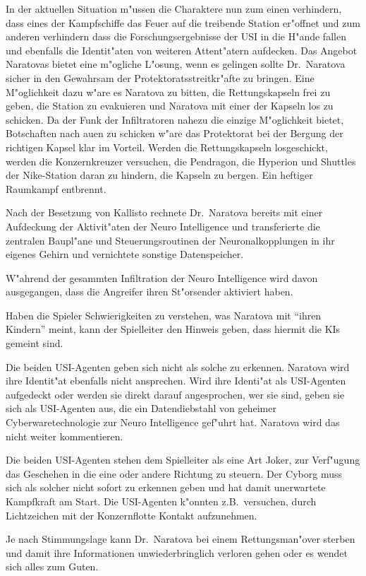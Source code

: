 In der aktuellen Situation m"ussen die Charaktere nun zum einen verhindern, dass eines der Kampfschiffe das Feuer auf die treibende Station er"offnet und zum anderen verhindern dass die Forschungsergebnisse der USI in die H"ande fallen und ebenfalls die Identit"aten von weiteren Attent"atern aufdecken. Das Angebot Naratovas bietet eine m"ogliche L"osung, wenn es gelingen sollte Dr.~Naratova sicher in den Gewahrsam der Protektoratsstreitkr"afte zu bringen. Eine M"oglichkeit dazu w"are es Naratova zu bitten, die Rettungskapseln frei zu geben, die Station zu evakuieren und Naratova mit einer der Kapseln los zu schicken. Da der Funk der Infiltratoren nahezu die einzige M"oglichkeit bietet, Botschaften nach au\3en zu schicken w"are das Protektorat bei der Bergung der richtigen Kapsel klar im Vorteil. Werden die Rettungskapseln losgeschickt, werden die Konzernkreuzer versuchen, die Pendragon, die Hyperion und Shuttles der Nike-Station daran zu hindern, die Kapseln zu bergen. Ein heftiger Raumkampf entbrennt.

\begin{remarks}
	Nach der Besetzung von Kallisto rechnete Dr.~Naratova bereits mit einer Aufdeckung der Aktivit"aten der Neuro Intelligence und transferierte die zentralen Baupl"ane und Steuerungsroutinen der Neuronalkopplungen in ihr eigenes Gehirn und vernichtete sonstige Datenspeicher.
	
	W"ahrend der gesammten Infiltration der Neuro Intelligence wird davon ausgegangen, dass die Angreifer ihren St"orsender aktiviert haben.
	
	Haben die Spieler Schwierigkeiten zu verstehen, was Naratova mit "`ihren Kindern"' meint, kann der Spielleiter den Hinweis geben, dass hiermit die KIs gemeint sind.
	
	Die beiden USI-Agenten geben sich nicht als solche zu erkennen. Naratova wird ihre Identit"at ebenfalls nicht ansprechen. Wird ihre Identi"at als USI-Agenten aufgedeckt oder werden sie direkt darauf angesprochen, wer sie sind, geben sie sich als USI-Agenten aus, die ein Datendiebstahl von geheimer Cyberwaretechnologie zur Neuro Intelligence gef"uhrt hat. Naratova wird das nicht weiter kommentieren.
	
	Die beiden USI-Agenten stehen dem Spielleiter als eine Art Joker, zur Verf"ugung das Geschehen in die eine oder andere Richtung zu steuern. Der Cyborg muss sich als solcher nicht sofort zu erkennen geben und hat damit unerwartete Kampfkraft am Start. Die USI-Agenten k"onnten z.B.~versuchen, durch Lichtzeichen mit der Konzernflotte Kontakt aufzunehmen.
	
	Je nach Stimmungslage kann Dr.~Naratova bei einem Rettungsman"over sterben und damit ihre Informationen unwiederbringlich verloren gehen oder es wendet sich alles zum Guten.
\end{remarks}